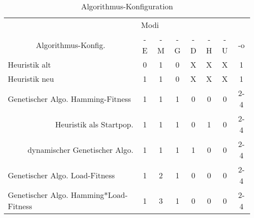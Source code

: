 	\begin{table}[htp]
		\centering
		\begin{tabular}{ccccccccc}
			\multicolumn{2}{l}{}                 & \multicolumn{7}{|l}{Modi}                                                               \\ 
			\multicolumn{2}{c}{Algorithmus-Konfig.}  & \multicolumn{1}{|c}{-E} & \multicolumn{1}{c}{-M} & \multicolumn{1}{c}{-G} & \multicolumn{1}{c}{-D} & \multicolumn{1}{c}{-H} & \multicolumn{1}{c}{-U} & \multicolumn{1}{c}{-o} \\ 
			\hline
		\multicolumn{2}{l}{Heuristik alt}  & \multicolumn{1}{|c}{0} & \multicolumn{1}{c}{1} & \multicolumn{1}{c}{0} & \multicolumn{1}{c}{X} & \multicolumn{1}{c}{X} & \multicolumn{1}{c}{X} & \multicolumn{1}{c}{1} \\
		\multicolumn{2}{l}{Heuristik neu}  & \multicolumn{1}{|c}{1} & \multicolumn{1}{c}{1} & \multicolumn{1}{c}{0} & \multicolumn{1}{c}{X} & \multicolumn{1}{c}{X} & \multicolumn{1}{c}{X} & \multicolumn{1}{c}{1} \\ 
		\multicolumn{2}{l}{Genetischer Algo. Hamming-Fitness}  & \multicolumn{1}{|c}{1} & \multicolumn{1}{c}{1} & \multicolumn{1}{c}{1} & \multicolumn{1}{c}{0} & \multicolumn{1}{c}{0} & \multicolumn{1}{c}{0} & \multicolumn{1}{c}{2-4} \\
			\multicolumn{2}{r}{Heuristik als Startpop.}  & \multicolumn{1}{|c}{1} & \multicolumn{1}{c}{1} & \multicolumn{1}{c}{1} & \multicolumn{1}{c}{0} & \multicolumn{1}{c}{1} & \multicolumn{1}{c}{0} & \multicolumn{1}{c}{2-4} \\
			\multicolumn{2}{r}{dynamischer Genetischer Algo.}  & \multicolumn{1}{|c}{1} & \multicolumn{1}{c}{1} & \multicolumn{1}{c}{1} & \multicolumn{1}{c}{1} & \multicolumn{1}{c}{0} & \multicolumn{1}{c}{0} & \multicolumn{1}{c}{2-4} \\
		\multicolumn{2}{l}{Genetischer Algo. Load-Fitness}  & \multicolumn{1}{|c}{1} & \multicolumn{1}{c}{2} & \multicolumn{1}{c}{1} & \multicolumn{1}{c}{0} & \multicolumn{1}{c}{0} & \multicolumn{1}{c}{0} & \multicolumn{1}{c}{2-4} \\ 
		\multicolumn{2}{l}{Genetischer Algo. Hamming*Load-Fitness}  & \multicolumn{1}{|c}{1} & \multicolumn{1}{c}{3} & \multicolumn{1}{c}{1} & \multicolumn{1}{c}{0} & \multicolumn{1}{c}{0} & \multicolumn{1}{c}{0} & \multicolumn{1}{c}{2-4}                     
		\end{tabular}
		\newline
		\caption{Algorithmus-Konfiguration}
		\label{tab:algo_conifg}
	\end{table}

